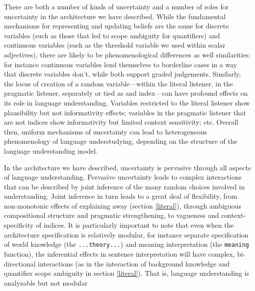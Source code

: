 \documentclass[pdfextras]{handbook}
\begin{document}
There are both a number of kinds of uncertainty and a number of roles for uncertainty in the architecture we have described.
While the fundamental mechanisms for representing and updating beliefs are the same for discrete variables (such as those that led to scope ambiguity for quantifiers) and continuous variables (such as the threshold variable we used within scalar adjectives), there are likely to be phenomenological differences as well similarities: for instance continuous variables lend themselves to borderline cases in a way that discrete variables don't, while both support graded judgements. Similarly, the locus of creation of a random variable---within the literal listener, in the pragmatic listener, separately or tied as and index---can have profound effects on its role in language understanding. Variables restricted to the literal listener show plausibility but not informativity effects; variables in the pragmatic listener that are not indices show informativity but limited context sensitivity; etc. Overall then, uniform mechanisms of uncertainty can lead to heterogeneous phenomenology of language understudying, depending on the structure of the language understanding model. 

In the architecture we have described, uncertainty is pervasive through all aspects of language understanding. Pervasive uncertainty leads to complex interactions that can be described by joint inference of the many random choices involved in understanding. Joint inference in turn leads to a great deal of flexibility, from non-monotonic effects of explaining away (section \ref{literal}), through ambiguous compositional structure and pragmatic strengthening, to vagueness and context-specificity of indices. It is particularly important to note that even when the architecture specification is relatively modular, for instance separate specification of world knowledge (the \lstinline{...theory...}) and meaning interpretation (the \lstinline{meaning} function), the inferential effects in sentence interpretation will have complex, bi-directional interactions (as in the interaction of background knowledge and quantifier scope ambiguity in section \ref{literal}). That is, language understanding is analyzable but not modular




\appendix
\end{document}

